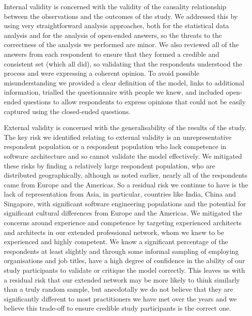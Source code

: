 Internal validity is concerned with the validity of the causality relationship between the observations and the outcomes of the study.  We addressed this by using very straightforward analysis approaches, both for the statistical data analysis and for the analysis of open-ended answers, so the threats to the correctness of the analysis we performed are minor.  We also reviewed all of the answers from each respondent to ensure that they formed a credible and consistent set (which all did), so validating that the respondents understood the process and were expressing a coherent opinion.  To avoid possible misunderstanding we provided a clear definition of the model, links to additional information, trialled the questionnaire with people we knew, and included open-ended questions to allow respondents to express opinions that could not be easily captured using the closed-ended questions.

External validity is concerned with the generalisability of the results of the study.  The key risk we identified relating to external validity is an unrepresentative respondent population or a respondent population who lack competence in software architecture and so cannot validate the model effectively.  We mitigated these risks by finding a relatively large respondent population, who are distributed geographically, although as noted earlier, nearly all of the respondents came from Europe and the Americas.  So a residual risk we continue to have is the lack of representation from Asia, in particular, countries like India, China and Singapore, with significant software engineering populations and the potential for significant cultural differences from Europe and the Americas.  We mitigated the concerns around experience and competence by targeting experienced architects and architects in our extended professional network, whom we knew to be experienced and highly competent.  We know a significant percentage of the respondents at least slightly and through some informal sampling of employing organisations and job titles, have a high degree of confidence in the ability of our study participants to validate or critique the model correctly.  This leaves us with a residual risk that our extended network may be more likely to think similarly than a truly random sample, but anecdotally we do not believe that they are significantly different to most practitioners we have met over the years and we believe this trade-off to ensure credible study participants is the correct one.


